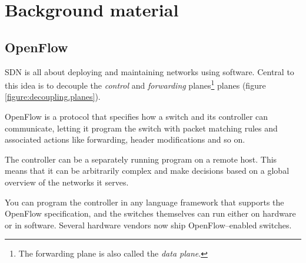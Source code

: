 \chapter{Background material}

\section{OpenFlow}

\acf{SDN} is all about deploying and maintaining networks using software.
Central to this idea is to decouple the \textit{control} and
\textit{forwarding}
planes\footnote{The forwarding plane is also called the \textit{data
  plane}.} planes (figure \ref{figure:decoupling.planes}).

OpenFlow is a protocol that specifies how a switch and its controller can
communicate, letting it program the switch with packet matching rules and
associated actions like forwarding, header modifications and so on.

The controller can be a separately running program on a remote host. This
means that it can be arbitrarily complex and make decisions based on a
global overview of the networks it serves.

You can program the controller in any language framework that supports the
OpenFlow specification, and the switches themselves can run either on
hardware or in software.  Several hardware vendors now ship
OpenFlow--enabled switches.

